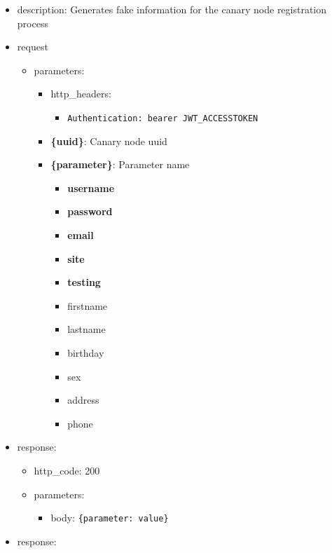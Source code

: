 \documentclass[
]{article}
\begin{document}
\begin{itemize}
\item
  description: Generates fake information for the canary node
  registration process
\item
  request

  \begin{itemize}
  \item
    parameters:

    \begin{itemize}
    \item
      http\_headers:

      \begin{itemize}
      \item
        \texttt{Authentication:\ \textquotesingle{}bearer\ JWT\_ACCESSTOKEN\textquotesingle{}}
      \end{itemize}
    \item
      \textbf{\{uuid\}}: Canary node uuid
    \item
      \textbf{\{parameter\}}: Parameter name

      \begin{itemize}
      \item
        \textbf{username}
      \item
        \textbf{password}
      \item
        \textbf{email}
      \item
        \textbf{site}
      \item
        \textbf{testing}
      \item
        firstname
      \item
        lastname
      \item
        birthday
      \item
        sex
      \item
        address
      \item
        phone
      \end{itemize}
    \end{itemize}
  \end{itemize}
\item
  response:

  \begin{itemize}
  \item
    http\_code: 200
  \item
    parameters:

    \begin{itemize}
    \item
      body:
      \texttt{\{\textquotesingle{}parameter\textquotesingle{}:\ \textquotesingle{}value\textquotesingle{}\}}
    \end{itemize}
  \end{itemize}
\item
  response:


\end{itemize}
\end{document}
